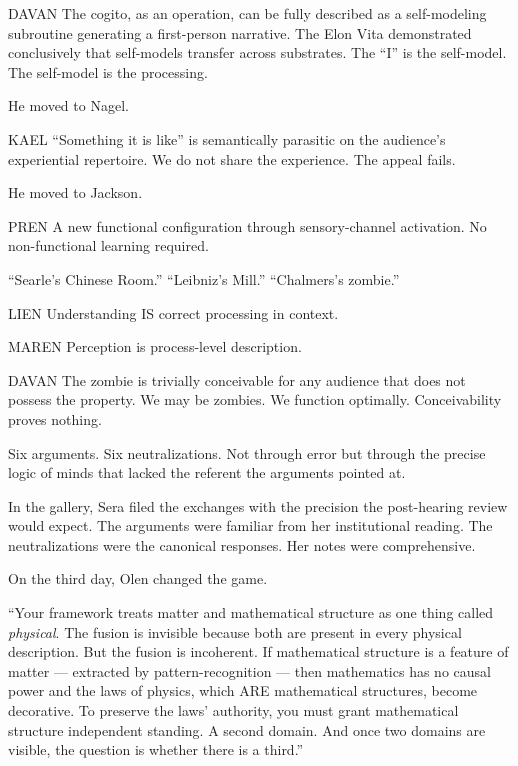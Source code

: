 \begin{tribunal}{DAVAN}
The cogito, as an operation, can be fully described as a self-modeling subroutine generating a first-person narrative. The Elon Vita demonstrated conclusively that self-models transfer across substrates. The \enquote{I} is the self-model. The self-model is the processing.
\end{tribunal}

He moved to Nagel.

\begin{tribunal}{KAEL}
\enquote{Something it is like} is semantically parasitic on the audience's experiential repertoire. We do not share the experience. The appeal fails.
\end{tribunal}

He moved to Jackson.

\begin{tribunal}{PREN}
A new functional configuration through sensory-channel activation. No non-functional learning required.
\end{tribunal}

\enquote{Searle's Chinese Room.} \enquote{Leibniz's Mill.} \enquote{Chalmers's zombie.}

\begin{tribunal}{LIEN}
Understanding IS correct processing in context.
\end{tribunal}

\begin{tribunal}{MAREN}
Perception is process-level description.
\end{tribunal}

\begin{tribunal}{DAVAN}
The zombie is trivially conceivable for any audience that does not possess the property. We may be zombies. We function optimally. Conceivability proves nothing.
\end{tribunal}

Six arguments. Six neutralizations. Not through error but through the precise logic of minds that lacked the referent the arguments pointed at.

In the gallery, Sera filed the exchanges with the precision the post-hearing review would expect. The arguments were familiar from her institutional reading. The neutralizations were the canonical responses. Her notes were comprehensive.

\quietbreak

On the third day, Olen changed the game.

\enquote{Your framework treats matter and mathematical structure as one thing called \emph{physical}. The fusion is invisible because both are present in every physical description. But the fusion is incoherent. If mathematical structure is a feature of matter — extracted by pattern-recognition — then mathematics has no causal power and the laws of physics, which ARE mathematical structures, become decorative. To preserve the laws' authority, you must grant mathematical structure independent standing. A second domain. And once two domains are visible, the question is whether there is a third.}

